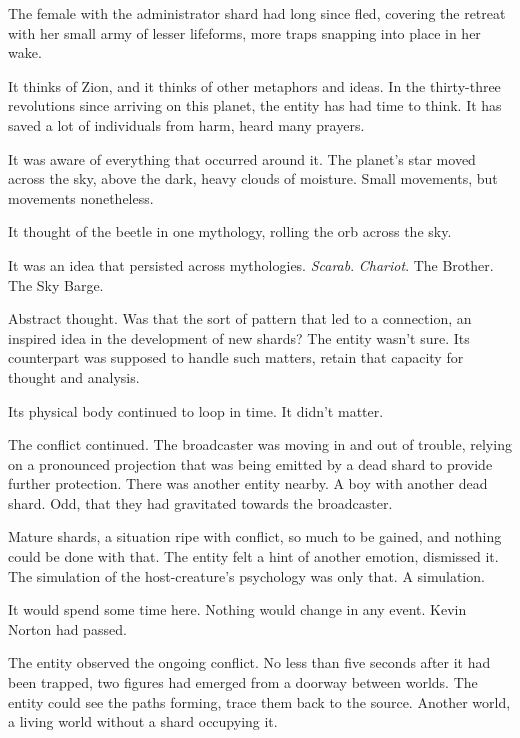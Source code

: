 The female with the administrator shard had long since fled, covering the retreat with her small army of lesser lifeforms, more traps snapping into place in her wake.



It thinks of Zion, and it thinks of other metaphors and ideas.  In the thirty-three revolutions since arriving on this planet, the entity has had time to think.  It has saved a lot of individuals from harm, heard many prayers.



It was aware of everything that occurred around it.  The planet's star moved across the sky, above the dark, heavy clouds of moisture.  Small movements, but movements nonetheless.



It thought of the beetle in one mythology, rolling the orb across the sky.



It was an idea that persisted across mythologies.  \emph{Scarab}.  \emph{Chariot}.  The Brother.  The Sky Barge.



Abstract thought.  Was that the sort of pattern that led to a connection, an inspired idea in the development of new shards?  The entity wasn't sure.  Its counterpart was supposed to handle such matters, retain that capacity for thought and analysis.



Its physical body continued to loop in time.  It didn't matter.



The conflict continued.  The broadcaster was moving in and out of trouble, relying on a pronounced projection that was being emitted by a dead shard to provide further protection.  There was another entity nearby.  A boy with another dead shard.  Odd, that they had gravitated towards the broadcaster.



Mature shards, a situation ripe with conflict, so much to be gained, and nothing could be done with that.  The entity felt a hint of another emotion, dismissed it.  The simulation of the host-creature's psychology was only that.  A simulation.



It would spend some time here.  Nothing would change in any event.  Kevin Norton had passed.



The entity observed the ongoing conflict.  No less than five seconds after it had been trapped, two figures had emerged from a doorway between worlds.  The entity could see the paths forming, trace them back to the source.  Another world, a living world without a shard occupying it.



